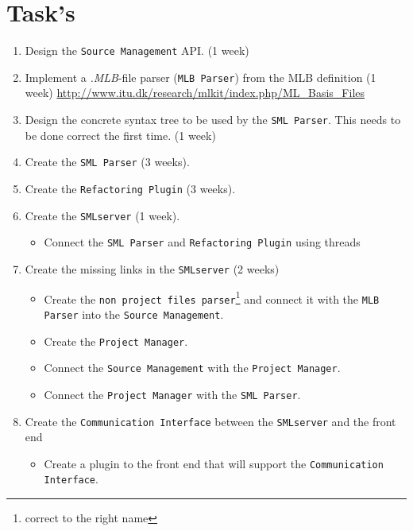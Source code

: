 \documentclass[a4paper,oneside]{memoir}
\begin{document}
\section{Task's}

\begin{enumerate}
\item Design the \texttt{Source Management} API. (1 week)

\item Implement a \textit{.MLB}-file parser (\texttt{MLB Parser}) from the MLB
  definition (1 week)
\url{http://www.itu.dk/research/mlkit/index.php/ML_Basis_Files}

\item Design the concrete syntax tree to be used by the \texttt{SML
    Parser}. This needs to be done correct the first time. (1 week)

\item Create the \texttt{SML Parser} (3 weeks).

\item Create the \texttt{Refactoring Plugin} (3 weeks).

\item Create the \texttt{SMLserver} (1 week).
  \begin{itemize}
  \item Connect the \texttt{SML Parser} and \texttt{Refactoring
      Plugin} using threads
  \end{itemize}

\item Create the missing links in the \texttt{SMLserver} (2 weeks)
  \begin{itemize}
  \item Create the \texttt{non project files parser}\footnote{correct to the
      right name} and connect it with the \texttt{MLB Parser} into the
    \texttt{Source Management}.

  \item Create the \texttt{Project Manager}.

  \item Connect the \texttt{Source Management} with the \texttt{Project
      Manager}.

  \item Connect the \texttt{Project Manager} with the \texttt{SML Parser}.
  \end{itemize}

\item Create the \texttt{Communication Interface} between the
  \texttt{SMLserver} and the front end
  \begin{itemize}
  \item Create a plugin to the front end that will support the
    \texttt{Communication Interface}.
  \end{itemize}
\end{enumerate}
\end{document}
